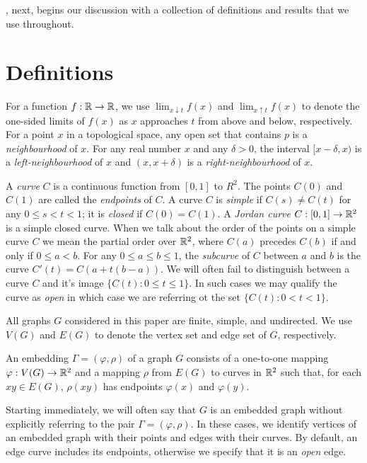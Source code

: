 \documentclass{patmorin}
\begin{document}
, next, begins our discussion with a collection of
definitions and results that we use throughout.


\section{Definitions}

For a function $f:\mathbb{R}\to\mathbb{R}$, we use $\lim_{x\downarrow t} f(x)$ and
$\lim_{x\uparrow t} f(x)$ to denote the one-sided limits of $f(x)$
as $x$ approaches $t$ from above and below, respectively.  For a
point $x$ in a topological space, any open set that contains $p$ is a
\emph{neighbourhood} of $x$.  For any real number $x$ and any $\delta>0$,
the interval $[x-\delta,x)$ is a \emph{left-neighbourhood} of $x$ and
$(x,x+\delta)$ is a \emph{right-neighbourhood} of $x$.

A \emph{curve} $C$ is a continuous function from $[0,1]$ to $R^2$.
The points $C(0)$ and $C(1)$ are called the \emph{endpoints} of $C$.
A curve $C$ is \emph{simple} if $C(s)\neq C(t)$ for any $0\le s<t< 1$; it
is \emph{closed} if $C(0)=C(1)$.  A \emph{Jordan curve} $C:[0,1]\to\mathbb{R}^2$
is a simple closed curve.  When we talk about the order of the points
on a simple curve $C$ we mean the partial order over $\mathbb{R}^2$, where
$C(a)$ precedes $C(b)$ if and only if $0\le a<b$. For any $0\le a\le
b\le 1$, the \emph{subcurve} of $C$ between $a$ and $b$ is the curve
$C'(t)=C(a+t(b-a))$.  We will often fail to distinguish between a
curve $C$ and it's image $\{C(t):0\le t\le 1\}$.  In such cases we may
qualify the curve as \emph{open} in which case we are referring ot the
set $\{C(t):0< t< 1\}$.

All graphs $G$ considered in this paper are finite, simple, and
undirected.   We use $V(G)$ and $E(G)$ to denote the vertex set and
edge set of $G$, respectively.  

An embedding $\Gamma=(\varphi,\rho)$ of a graph $G$ consists
of a one-to-one mapping $\varphi:V(G)\to\mathbb{R}^2$ and a mapping $\rho$ from
$E(G)$ to curves in $\mathbb{R}^2$ such that, for each $xy\in E(G)$, $\rho(xy)$
has endpoints $\varphi(x)$ and $\varphi(y)$.

Starting immediately,  we will often say that $G$ is an embedded graph
without explicitly referring to the pair $\Gamma=(\varphi,\rho)$.
In these cases, we identify vertices of an embedded graph with their
points and edges with their curves. By default, an edge curve includes
its endpoints, otherwise we specify that it is an \emph{open} edge.
\end{document}

